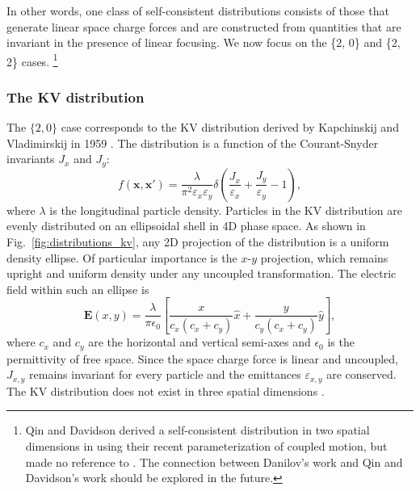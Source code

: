 In other words, one class of self-consistent distributions consists of those that generate linear space charge forces and are constructed from quantities that are invariant in the presence of linear focusing. We now focus on the \{2, 0\} and \{2, 2\} cases. \footnote{Qin and Davidson derived a self-consistent distribution in two spatial dimensions in \cite{Qin2013} using their recent parameterization of coupled motion, but made no reference to \cite{Danilov2003}. The connection between Danilov's work and Qin and Davidson's work should be explored in the future.}


\subsubsection{The KV distribution}

The $\{2, 0\}$ case corresponds to the KV distribution derived by Kapchinskij and Vladimirskij in 1959 \cite{Kapchinskij1959}. The distribution is a function of the Courant-Snyder invariants $J_x$ and $J_y$:
%
\begin{equation}
    f(\mathbf{x}, \mathbf{x}') = \frac{\lambda}{\pi^2 \varepsilon_x\varepsilon_y}
    \delta \left(\frac{J_x}{\varepsilon_x} + \frac{J_y}{\varepsilon_y} -1 \right),
\end{equation}
%
where $\lambda$ is the longitudinal particle density. Particles in the KV distribution are evenly distributed on an ellipsoidal shell in 4D phase space. As shown in Fig.~\ref{fig:distributions_kv}, any 2D projection of the distribution is a uniform density ellipse. Of particular importance is the $x$-$y$ projection, which remains upright and uniform density under any uncoupled transformation. The electric field within such an ellipse is
%
\begin{equation}  \label{eq:field_in_upright_ellipse}
    \mathbf{E}(x, y) =
    \frac{\lambda}{\pi\epsilon_0}
    \left[ 
        \frac{x}{c_x\left(c_x+c_y\right)} \hat{x}
        + \frac{y}{c_y\left(c_x+c_y\right)} \hat{y}
    \right],
\end{equation}
%
where $c_x$ and $c_y$ are the horizontal and vertical semi-axes and $\epsilon_0$ is the permittivity of free space. Since the space charge force is linear and uncoupled, $J_{x,y}$ remains invariant for every particle and the emittances $\varepsilon_{x,y}$ are conserved. The KV distribution does not exist in three spatial dimensions \cite{Sacherer1968}.

